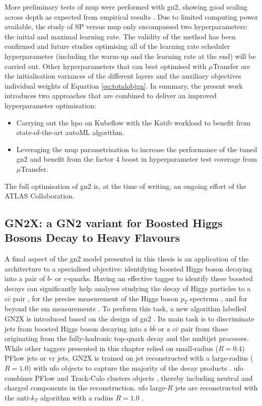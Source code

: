 More preliminary tests of \gls{mup} were performed with \gls{gn2}, showing good scaling across depth as expected from empirical results \cite{yang2021tuning}. Due to limited computing power available, the study of SP versus \gls{mup} only encompassed two hyperparameters: the initial and maximal learning rate. The validity of the method has been confirmed and future studies optimising all of the learning rate scheduler hyperparameter (including the warm-up and the learning rate at the end) will be carried out. Other hyperparameters that can best optimised with $\mu$Transfer are the initialisation variances of the different layers and the auxiliary objectives individual weights of Equation \ref{eq:totalobjgn}. In summary, the present work introduces two approaches that are combined to deliver an improved hyperparameter optimisation:
\begin{itemize}
  \item Carrying out the \gls{hpo} on Kubeflow with the Katib workload to benefit from state-of-the-art autoML algorithm.
  \item Leveraging the \gls{mup} parametrisation to increase the performance of the tuned \gls{gn2} and benefit from the factor 4 boost in hyperparameter test coverage from $\mu$Transfer.
\end{itemize}
The full optimisation of \gls{gn2} is, at the time of writing, an ongoing effort of the ATLAS Collaboration.

\subsection{GN2X: a GN2 variant for Boosted Higgs Bosons Decay to Heavy Flavours}\label{chap-GN2X}
A final aspect of the \gls{gn2} model presented in this thesis is an application of the architecture to a specialised objective: identifying boosted Higgs boson decaying into a pair of $b$- or $c$-quarks. Having an effective tagger to identify these boosted decays can significantly help analyses studying the decay of Higgs particles to a $c\bar{c}$ pair \cite{ATLAS:2022ers}, for the precise measurement of the Higgs boson $p_T$ spectrum \cite{PhysRevD.105.092003}, and for beyond the \gls{sm} measurements \cite{ATLAS:2023azi}. To perform this task, a new algorithm labelled GN2X is introduced based on the design of \gls{gn2} \cite{ATL-PHYS-PUB-2023-021}. Its main task is to discriminate jets from boosted Higgs boson decaying into a $b\bar{b}$ or a $c\bar{c}$ pair from those originating from the fully-hadronic top-quark decay and the multijet processes. While other taggers presented in this chapter relied on small-radius ($R=0.4$) PFlow jets or \gls{vr} jets, GN2X is trained on jet reconstructed with a large-radius ($R=1.0$) with \gls{ufo} objects to capture the majority of the decay products \cite{atlasLARGERJet}. \gls{ufo} combines PFlow \cite{atlasPFLOW} and Track-Calo clusters objects \cite{ATL-PHYS-PUB-2017-015}, thereby including neutral and charged components in the reconstruction. \gls{ufo} large-$R$ jets are reconstructed with the anti-$k_T$ algorithm with a radius $R = 1.0$ \cite{Cacciari:2008gp}. \\

